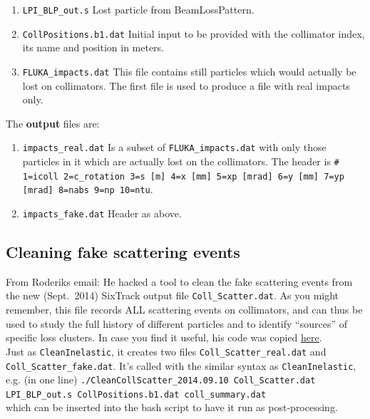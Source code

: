 \documentclass[a4paper, oneside, final]{scrartcl}
\begin{document}
{{{{\begin{enumerate}
\item \texttt{LPI\_BLP\_out.s} Lost particle from BeamLossPattern.
\item \texttt{CollPositions.b1.dat} Initial input to be provided with the collimator index, its name and position in meters.
\item \texttt{FLUKA\_impacts.dat} This file contains still particles which would actually be lost on collimators. The first file is used to produce a file with real impacts only.
\end{enumerate}

The \textbf{output} files are:

\begin{enumerate}

\item \texttt{impacts\_real.dat} Is a subset of \texttt{FLUKA\_impacts.dat} with only those particles in it which are actually lost on the collimators. The header is \texttt{\# 1=icoll 2=c\_rotation 3=s [m] 4=x [mm] 5=xp [mrad] 6=y [mm] 7=yp [mrad] 8=nabs 9=np 10=ntu}.
\item \texttt{impacts\_fake.dat} Header as above.
\end{enumerate}


\subsection{Cleaning fake scattering events\label{CleanCollScatter}}

From Roderiks email: He hacked a tool to clean the fake scattering events from the new (Sept.~2014) SixTrack output file \texttt{Coll\_Scatter.dat}. 
As you might remember, this file records ALL scattering events on collimators, and can thus be used to study the full history of different particles 
and to identify ``sources'' of specific loss clusters. In case you find it useful, his code was copied {\href{https://github.com/rkwee/LHC-Collimation/tree/master/PostSixTrack/CleanCollScatter}{here}}.\\

Just as \texttt{CleanInelastic}, it creates two files \texttt{Coll\_Scatter\_real.dat} and\\ \texttt{Coll\_Scatter\_fake.dat}. It's called with the similar syntax as \texttt{CleanInelastic}, e.g. (in one line)\newline
\texttt{./CleanCollScatter\_2014.09.10 Coll\_Scatter.dat}\\ \texttt{LPI\_BLP\_out.s CollPositions.b1.dat coll\_summary.dat}\\
which can be inserted into the bash script to have it run as post-processing.

}}}}
\end{document}
